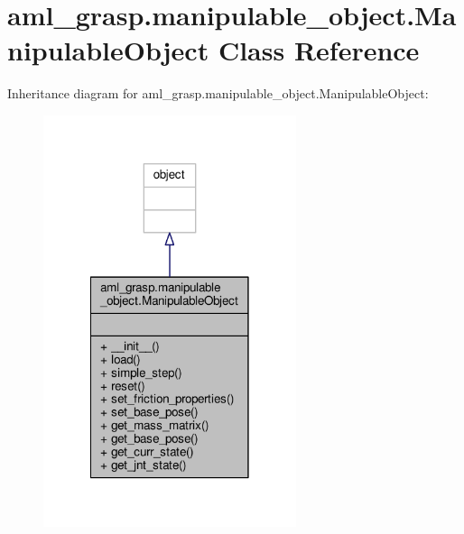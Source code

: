 \hypertarget{classaml__grasp_1_1manipulable__object_1_1_manipulable_object}{\section{aml\-\_\-grasp.\-manipulable\-\_\-object.\-Manipulable\-Object Class Reference}
\label{classaml__grasp_1_1manipulable__object_1_1_manipulable_object}
}


Inheritance diagram for aml\-\_\-grasp.\-manipulable\-\_\-object.\-Manipulable\-Object\-:
\nopagebreak
\begin{figure}[H]
\begin{center}
\leavevmode
\includegraphics[width=210pt]{classaml__grasp_1_1manipulable__object_1_1_manipulable_object__inherit__graph}
\end{center}
\end{figure}


